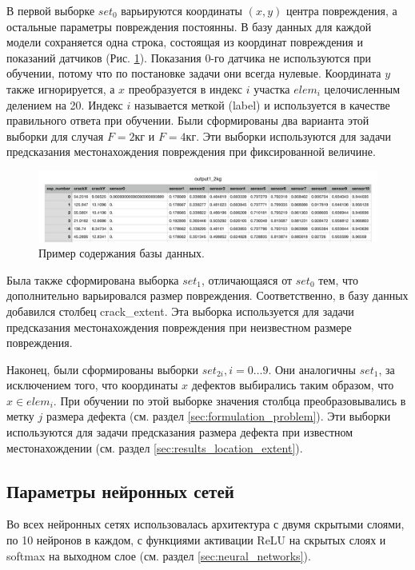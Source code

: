 \documentclass[a4paper,12pt]{article}
\theoremstyle{remark}
\begin{document}
	В первой выборке $set_0$ варьируются координаты $(x, y)$ центра повреждения, а остальные параметры повреждения постоянны. В базу данных для каждой модели сохраняется одна строка, состоящая из координат повреждения и показаний датчиков (Рис. \ref{bd_sample}). Показания 0-го датчика не используются при обучении, потому что по постановке задачи они всегда нулевые. Координата $y$ также игнорируется, а $x$ преобразуется в индекс $i$ участка $elem_i$ целочисленным делением на 20. Индекс $i$ называется меткой (label) и используется в качестве правильного ответа при обучении. Были сформированы два варианта этой выборки для случая $F = 2\text{кг}$ и $F = 4\text{кг}$. Эти выборки используются для задачи предсказания местонахождения повреждения при фиксированной величине.
	\begin{figure}[h]
		\includegraphics[width=\textwidth]{db_sample.png}
		\caption{Пример содержания базы данных.}
		\label{bd_sample}
	\end{figure}

	Была также сформирована выборка $set_1$, отличающаяся от $set_0$ тем, что дополнительно варьировался размер повреждения. 	Соответственно, в базу данных добавился столбец crack\_extent. Эта выборка используется для задачи предсказания местонахождения повреждения при неизвестном размере повреждения.
 
 	Наконец, были сформированы выборки $set_{2i}, i = 0 \dots 9$. Они аналогичны $set_1$, за исключением того, что координаты $x$ дефектов выбирались таким образом, что $x \in elem_i$. При обучении по этой выборке значения столбца преобразовывались в метку $j$ размера дефекта (см. раздел \ref{sec:formulation_problem}). Эти выборки используются для задачи предсказания размера дефекта при известном местонахождении (см. раздел \ref{sec:results_location_extent}).
 	
 	\subsection{Параметры нейронных сетей}
 	Во всех нейронных сетях использовалась архитектура с двумя скрытыми слоями, по 10 нейронов в каждом, с функциями активации ReLU на скрытых слоях и softmax на выходном слое (см. раздел \ref{sec:neural_networks}).
 	
\end{document}
